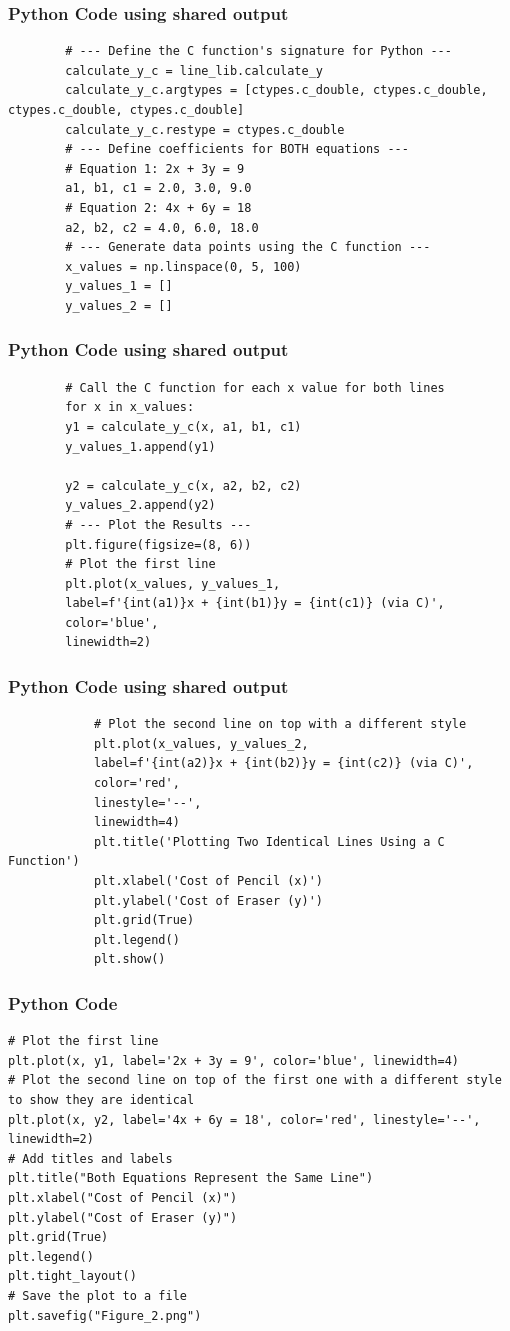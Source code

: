 \documentclass{beamer}
\begin{document}
	
	\begin{frame}[fragile]
		\frametitle{Python Code using shared output}
		\begin{lstlisting}
		# --- Define the C function's signature for Python ---
		calculate_y_c = line_lib.calculate_y
		calculate_y_c.argtypes = [ctypes.c_double, ctypes.c_double, ctypes.c_double, ctypes.c_double]
		calculate_y_c.restype = ctypes.c_double
		# --- Define coefficients for BOTH equations ---
		# Equation 1: 2x + 3y = 9
		a1, b1, c1 = 2.0, 3.0, 9.0
		# Equation 2: 4x + 6y = 18
		a2, b2, c2 = 4.0, 6.0, 18.0
		# --- Generate data points using the C function ---
		x_values = np.linspace(0, 5, 100)
		y_values_1 = []
		y_values_2 = []	
		\end{lstlisting}
	\end{frame}
	\begin{frame}[fragile]
		\frametitle{Python Code using shared output}
		\begin{lstlisting}		
		# Call the C function for each x value for both lines
		for x in x_values:
		y1 = calculate_y_c(x, a1, b1, c1)
		y_values_1.append(y1)
		
		y2 = calculate_y_c(x, a2, b2, c2)
		y_values_2.append(y2)
		# --- Plot the Results ---
		plt.figure(figsize=(8, 6))
		# Plot the first line
		plt.plot(x_values, y_values_1, 
		label=f'{int(a1)}x + {int(b1)}y = {int(c1)} (via C)', 
		color='blue', 
		linewidth=2)
		\end{lstlisting}
	\end{frame}
	\begin{frame}[fragile]
		\frametitle{Python Code using shared output}
		\begin{lstlisting}		
			# Plot the second line on top with a different style
			plt.plot(x_values, y_values_2, 
			label=f'{int(a2)}x + {int(b2)}y = {int(c2)} (via C)', 
			color='red', 
			linestyle='--', 
			linewidth=4)
			plt.title('Plotting Two Identical Lines Using a C Function')
			plt.xlabel('Cost of Pencil (x)')
			plt.ylabel('Cost of Eraser (y)')
			plt.grid(True)
			plt.legend()
			plt.show()
		\end{lstlisting}
	\end{frame}
	\begin{frame}[fragile]
		\frametitle{Python Code}
		\begin{lstlisting}
# Plot the first line
plt.plot(x, y1, label='2x + 3y = 9', color='blue', linewidth=4)
# Plot the second line on top of the first one with a different style to show they are identical
plt.plot(x, y2, label='4x + 6y = 18', color='red', linestyle='--', linewidth=2)
# Add titles and labels
plt.title("Both Equations Represent the Same Line")
plt.xlabel("Cost of Pencil (x)")
plt.ylabel("Cost of Eraser (y)")
plt.grid(True)
plt.legend()
plt.tight_layout()
# Save the plot to a file
plt.savefig("Figure_2.png")
		\end{lstlisting}
		
	\end{frame}
	
\end{document}
